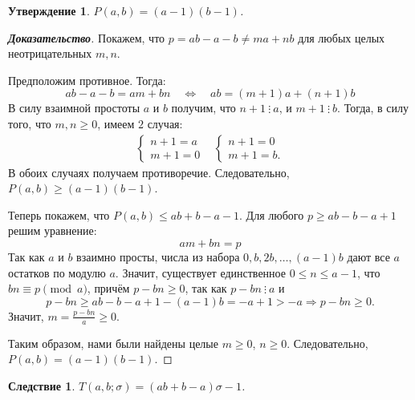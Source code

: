\documentclass[12pt]{article}
\newtheorem{proposition}[theorem]{Утверждение}
\newtheorem{corollary}[theorem]{Следствие}
\begin{document}
\begin{proposition}
$P(a, b) = (a - 1)(b - 1)$.
\end{proposition}
\begin{proof}[\textbf{Доказательство}]
Покажем, что $p = ab - a - b \ne ma + nb$ для любых целых неотрицательных $m, n$.

Предположим противное. Тогда: \begin{equation*}
 ab - a - b = am + bn \quad \Longleftrightarrow \quad ab = (m + 1)a + (n + 1) b
\end{equation*}
В силу взаимной простоты $a$ и $b$ получим, что $n + 1 \ \vdots \ a$, и $m + 1 \ \vdots \ b$. Тогда, в силу того, что $m, n \ge 0$, имеем $2$ случая:\begin{align*}
     \begin{cases}
        n + 1 = a\\
        m + 1 = 0
    \end{cases}
    &
    \begin{cases}
        n + 1 = 0\\
        m + 1 = b.
    \end{cases}
\end{align*}
В обоих случаях получаем противоречие. Следовательно, $P(a, b) \ge (a - 1)(b - 1)$.

Теперь покажем, что $P(a, b) \le ab + b - a - 1$. Для любого $p \ge ab - b - a + 1$ решим уравнение: \begin{equation*}
am + bn = p
\end{equation*}
Так как $a$ и $b$ взаимно просты, числа из набора $0, b, 2b, \dots, (a - 1)b$ дают все $a$ остатков по модулю $a$. Значит, существует единственное $0 \le n \le a - 1$, что $bn \equiv p \pmod a$, причём $p - bn \ge 0$, так как $p - bn \ \vdots \ a$ и
\begin{equation*}
p - bn \ge ab - b - a + 1 - (a - 1)b = -a + 1 > -a \Longrightarrow p - bn \ge 0.
\end{equation*}
Значит, $m = \frac{p - bn}{a} \ge 0$.

Таким образом, нами были найдены целые $m \ge 0$, $n \ge 0$. Следовательно, $P(a, b) = (a - 1)(b - 1)$.
\end{proof}
\begin{corollary}
$T(a, b; \sigma) = (ab + b - a)\sigma - 1$.
\end{corollary}
\end{document}
